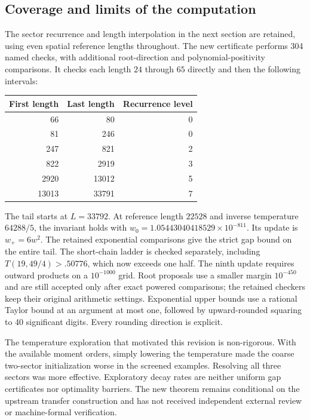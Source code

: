 \subsection{Coverage and limits of the computation}
The sector recurrence and length interpolation in the next section
are retained, using even spatial reference lengths throughout.
The new certificate performs 304 named checks, with additional root-direction
and polynomial-positivity comparisons. It checks each length $24$ through
$65$ directly and then the following intervals:
\begin{center}
\begin{tabular}{rrr}
\toprule
First length & Last length & Recurrence level \\
\midrule
66 & 80 & 0 \\
81 & 246 & 0 \\
247 & 821 & 2 \\
822 & 2919 & 3 \\
2920 & 13012 & 5 \\
13013 & 33791 & 7 \\
\bottomrule
\end{tabular}
\end{center}
The tail starts at $L=33792$. At reference length $22528$ and inverse
temperature $64288/5$, the invariant holds with
$w_0=1.05443040418529\times10^{-811}$. Its update is $w_+=6w^2$.
The retained exponential comparisons give the strict gap bound on the
entire tail. The short-chain ladder is checked separately, including
$T(19,49/4)>.50776$, which now exceeds one half.
The ninth update requires outward products on a $10^{-1000}$ grid.
Root proposals use a smaller margin $10^{-450}$ and are still accepted
only after exact powered comparisons; the retained checkers keep
their original arithmetic settings. Exponential upper bounds use a rational
Taylor bound at an argument at most one, followed by upward-rounded
squaring to 40 significant digits. Every rounding direction is explicit.

The temperature exploration that motivated this revision is
non-rigorous. With the available moment orders, simply lowering the
temperature made the coarse two-sector initialization worse in the
screened examples. Resolving all three sectors was more effective.
Exploratory decay rates are neither uniform gap certificates nor
optimality barriers. The new theorem remains conditional on the
upstream transfer construction and has not received independent
external review or machine-formal verification.

\newpage
